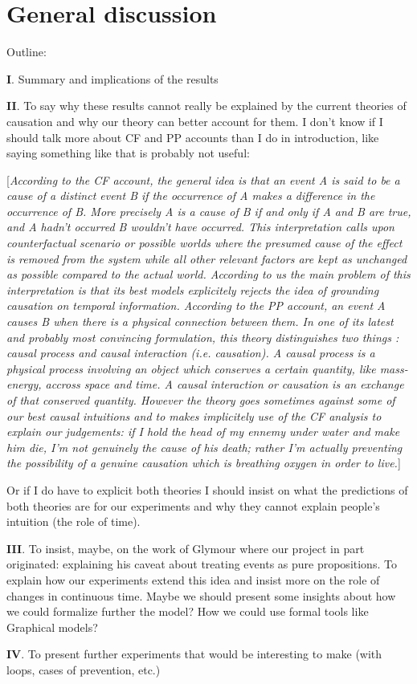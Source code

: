 \documentclass[10pt,letterpaper]{article}
\begin{document}
\newpage
\section{General discussion}

Outline:

\textbf{I}. Summary and implications of the results

\textbf{II}. To say why these results cannot really be explained by the current theories of causation and why our theory can better account for them. I don't know if I should talk more about CF and PP accounts than I do in introduction, like saying something like that is probably not useful:

[\textit{According to the CF account, the general idea is that an event A is said to be a cause of a distinct event B if the occurrence of A makes a difference in the occurrence of B. More precisely A is a cause of B if and only if A and B are true, and A hadn't occurred B wouldn't have occurred. This interpretation calls upon counterfactual scenario or possible worlds where the presumed cause of the effect is removed from the system while all other relevant factors are kept as unchanged as possible compared to the actual world. According to us the main problem of this interpretation is that its best models explicitely rejects the idea of grounding causation on temporal information.
According to the PP account, an event A causes B when there is a physical connection between them. In one of its latest and probably most convincing formulation, this theory distinguishes two things : causal process and causal interaction (i.e. causation). A causal process is a physical process involving an object which conserves a certain quantity, like mass-energy, accross space and time. A causal interaction or causation is an exchange of that conserved quantity. However the theory goes sometimes against some of our best causal intuitions and to makes implicitely use of the CF analysis to explain our judgements: if I hold the head of my ennemy under water and make him die, I'm not genuinely the cause of his death; rather I'm actually preventing the possibility of a genuine causation which is breathing oxygen in order to live.}]

Or if I do have to explicit both theories I should insist on what the predictions of both theories are for our experiments and why they cannot explain people's intuition (the role of time).

\textbf{III}. To insist, maybe, on the work of Glymour where our project in part originated: explaining his caveat about treating events as pure propositions. To explain how our experiments extend this idea and insist more on the role of changes in continuous time. Maybe we should present some insights about how we could formalize further the model? How we could use formal tools like Graphical models?

\textbf{IV}. To present further experiments that would be interesting to make (with loops, cases of prevention, etc.)




\setlength{\bibleftmargin}{.125in}
\setlength{\bibindent}{-\bibleftmargin}


\end{document}
